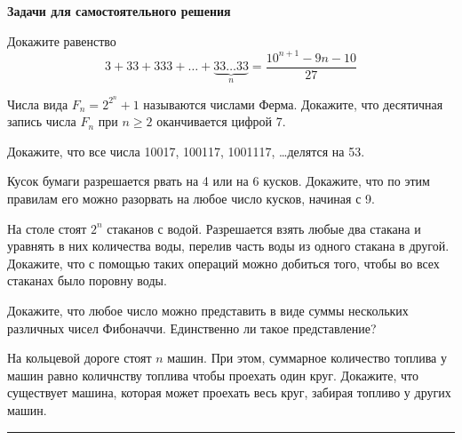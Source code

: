 {\bf Задачи для самостоятельного решения}
\begin{problems}



\item
Докажите равенство $$3 + 33 + 333 + \ldots + \underbrace{33 \ldots
33}_n = \dfrac{10^{n+1} - 9n - 10}{27}$$

\item Числа вида $F_n = 2^{2^n} + 1$ называются числами Ферма. Докажите, что десятичная запись числа $F_n$ при $n \geqslant 2$ оканчивается цифрой 7.

\item Докажите, что все числа 10017, 100117, 1001117, \ldots делятся на 53.
\item Кусок бумаги разрешается рвать на 4 или на 6 кусков. Докажите, что по этим правилам его можно разорвать на любое число кусков, начиная с 9.
\item На столе стоят $2^n$ стаканов с водой. Разрешается взять любые два стакана и уравнять в них количества воды, перелив часть воды из одного стакана в другой. Докажите, что с помощью таких операций можно добиться того, чтобы во всех стаканах было поровну воды. 
\item Докажите, что любое число можно представить в виде суммы нескольких различных чисел Фибоначчи. Единственно ли такое представление?
\item На кольцевой дороге стоят $n$ машин. При этом, суммарное количество топлива у машин  равно количнству топлива чтобы проехать один круг. Докажите, что существует машина, которая может проехать весь круг, забирая топливо у других машин.

\strut\hrule


\end{problems}
